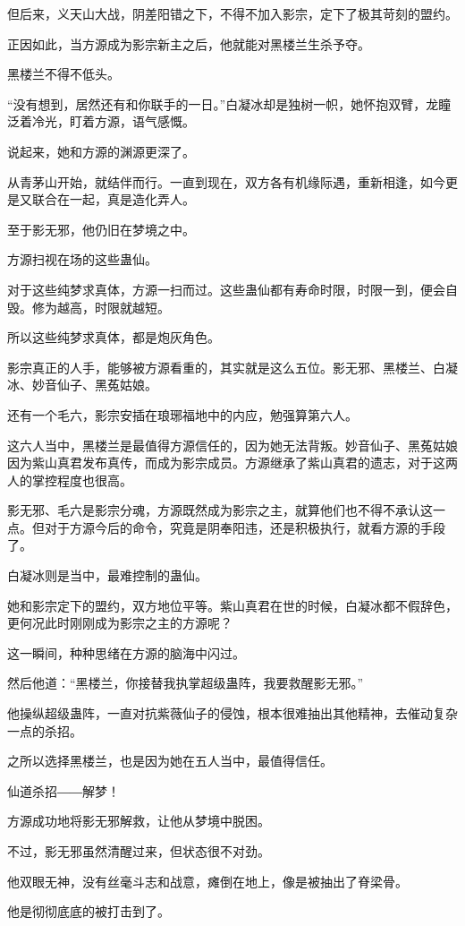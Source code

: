 \begin{this_body}
但后来，义天山大战，阴差阳错之下，不得不加入影宗，定下了极其苛刻的盟约。

正因如此，当方源成为影宗新主之后，他就能对黑楼兰生杀予夺。

黑楼兰不得不低头。

“没有想到，居然还有和你联手的一日。”白凝冰却是独树一帜，她怀抱双臂，龙瞳泛着冷光，盯着方源，语气感慨。

说起来，她和方源的渊源更深了。

从青茅山开始，就结伴而行。一直到现在，双方各有机缘际遇，重新相逢，如今更是又联合在一起，真是造化弄人。

至于影无邪，他仍旧在梦境之中。

方源扫视在场的这些蛊仙。

对于这些纯梦求真体，方源一扫而过。这些蛊仙都有寿命时限，时限一到，便会自毁。修为越高，时限就越短。

所以这些纯梦求真体，都是炮灰角色。

影宗真正的人手，能够被方源看重的，其实就是这么五位。影无邪、黑楼兰、白凝冰、妙音仙子、黑菟姑娘。

还有一个毛六，影宗安插在琅琊福地中的内应，勉强算第六人。

这六人当中，黑楼兰是最值得方源信任的，因为她无法背叛。妙音仙子、黑菟姑娘因为紫山真君发布真传，而成为影宗成员。方源继承了紫山真君的遗志，对于这两人的掌控程度也很高。

影无邪、毛六是影宗分魂，方源既然成为影宗之主，就算他们也不得不承认这一点。但对于方源今后的命令，究竟是阴奉阳违，还是积极执行，就看方源的手段了。

白凝冰则是当中，最难控制的蛊仙。

她和影宗定下的盟约，双方地位平等。紫山真君在世的时候，白凝冰都不假辞色，更何况此时刚刚成为影宗之主的方源呢？

这一瞬间，种种思绪在方源的脑海中闪过。

然后他道：“黑楼兰，你接替我执掌超级蛊阵，我要救醒影无邪。”

他操纵超级蛊阵，一直对抗紫薇仙子的侵蚀，根本很难抽出其他精神，去催动复杂一点的杀招。

之所以选择黑楼兰，也是因为她在五人当中，最值得信任。

仙道杀招――解梦！

方源成功地将影无邪解救，让他从梦境中脱困。

不过，影无邪虽然清醒过来，但状态很不对劲。

他双眼无神，没有丝毫斗志和战意，瘫倒在地上，像是被抽出了脊梁骨。

他是彻彻底底的被打击到了。


\end{this_body}
